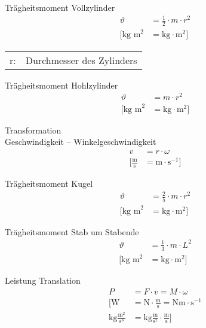 \begin{karte}{Trägheitsmoment Vollzylinder}
    \begin{align*}
        \vartheta &= \frac{1}{2} \cdot m \cdot r^2 \\
        \bigg[ \text{kg m}^2 &=
            \text{kg} \cdot \text{m}^2 
            \bigg]
    \end{align*}
    \begin{tabular}[t]{cl}
        r:& Durchmesser des Zylinders
    \end{tabular}
\end{karte}

\begin{karte}{Trägheitsmoment Hohlzylinder}
    \begin{align*}
        \vartheta &= m \cdot r^2 \\
        \bigg[ \text{kg m}^2 &=
            \text{kg} \cdot \text{m}^2 
            \bigg]
    \end{align*}
\end{karte}

\begin{karte}{Transformation \\ Geschwindigkeit -- Winkelgeschwindigkeit}
    \begin{align*}
        v &= r \cdot \omega \\
        \bigg[ \frac{\text{m}}{\text{s}} &= 
            \text{m} \cdot \text{s}^{-1}
            \bigg]
    \end{align*}
\end{karte}

\begin{karte}{Trägheitsmoment Kugel}
    \begin{align*}
        \vartheta &= \frac{2}{5} \cdot m \cdot r^2 \\
        \bigg[ \text{kg m}^2 &=
            \text{kg} \cdot \text{m}^2 
            \bigg]
    \end{align*}
\end{karte}

\begin{karte}{Trägheitsmoment Stab um Stabende}
    \begin{align*}
        \vartheta &= \frac{1}{3} \cdot m \cdot L^2 \\
        \bigg[ \text{kg m}^2 &=
            \text{kg} \cdot \text{m}^2 
            \bigg]
    \end{align*}
\end{karte}

\begin{karte}{Leistung Translation}
    \begin{align*}
       P &= F \cdot v = M \cdot \omega \\
       \bigg[ \text{W} &= \text{N} \cdot \frac{\text{m}}{\text{s}}  = \text{Nm} \cdot \text{s}^{-1} \\
           \text{kg} \frac{\text{m}^2}{\text{s}^3} &= \text{kg}\frac{\text{m}}{\text{s}^2} \cdot \frac{\text{m}}{\text{s}}
           \bigg]
    \end{align*}
\end{karte}

